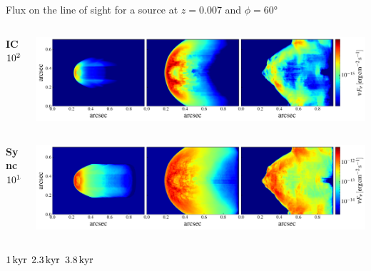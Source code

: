\begin{frame}{Flux on the line of sight for a source at $z=0.007$ and $\phi=60$°}
	\begin{columns}
		\begin{column}{0.1\textwidth}
				{\small {\bf IC} \\$10^{24}\,{\rm Hz}$  }
		\end{column}
		\begin{column}{\textwidth}
	\includegraphics[width=\linewidth]{images/2dmaps/2Dmap_flux_freq_24_dist_31_phi_60_ic.pdf}
		\end{column}
	\end{columns}
	\begin{columns}
		\begin{column}{0.1\textwidth}
				{\small{\bf Sync} \\ $10^{18}\,{\rm Hz}$}
		\end{column}
		\begin{column}{\textwidth}

	\includegraphics[width=\linewidth]{images/2dmaps/2Dmap_flux_freq_18_dist_31_phi_60_sync.pdf}
		\end{column}
	\end{columns}
	\vspace{8pt}
		\hspace{70pt} $1\,{\rm kyr}$ \hspace{60pt} $2.3\,{\rm kyr}$ \hspace{60pt} $3.8\,{\rm kyr}$
\end{frame}

